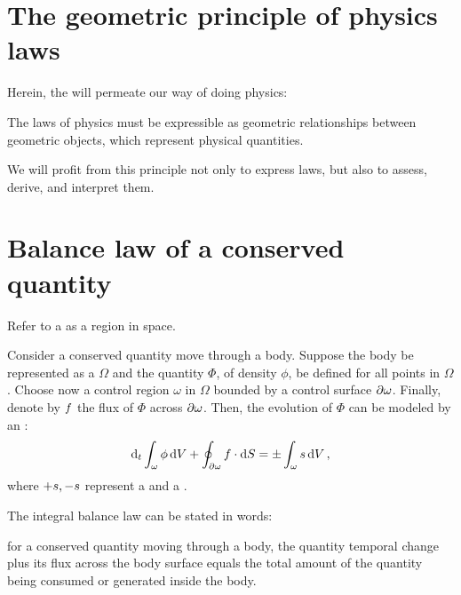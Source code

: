 
\section{The geometric principle of physics laws}
\label{sec:geometric-principle-physics-laws}

Herein, the  will permeate our way of doing physics:~\cite[chap. 1, p. iii]{thorne2013}
%
\begin{axiom}\label{axm:geometric-principle-physics-laws}
  The laws of physics must be expressible as geometric relationships between geometric objects, which represent physical quantities.
\end{axiom}
%
We will profit from this principle not only to express laws, but also to assess, derive, and interpret them.


\section{Balance law of a conserved quantity}
\label{sec:balance-law-conserved-quantity}

\begin{definition}
  Refer to a  as a region in space.
\end{definition}

\begin{observation}\label{obs:balance-law-conserved-quantity}
  Consider a conserved quantity move through a body. Suppose the body be represented as a  $\Omega$ and the quantity $\Phi$, of density $\phi$, be defined for all points in  $\Omega$. Choose now a control region $\omega$ in $\Omega$ bounded by a control surface $\partial\omega$. Finally, denote by $f$ the flux of $\Phi$ across $\partial\omega$. Then, the evolution of $\Phi$ can be modeled by an :
  \begin{equation}\label{eqn:integral-balance-law}
    \mathrm{d}_{t}\int_{\omega}\phi\,\mathrm{d} V
    + \oint_{\partial\omega}f\cdot\mathrm{d} S
    =
    \pm \int_{\omega}s\,\mathrm{d} V\,,
  \end{equation}
  where $+s,-s$ represent a  and a .
\end{observation}
%
The integral balance law can be stated in words:~\cite[p. 5]{mishra2016}
%
\begin{law}
  for a conserved quantity moving through a body, the quantity temporal change plus its flux across the body surface equals the total amount of the quantity being consumed or generated inside the body.
\end{law}

